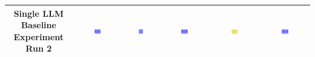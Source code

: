 \begin{table}[H]
\begin{tabular}{|c|c|c|c|c|c|}
    Single LLM Baseline Experiment Run 2 & \includegraphics[width=0.15\textwidth]{./run_2/png/gpt-4o_results/MicrofluidicChip.png} & \includegraphics[width=0.15\textwidth]{./run_2/png/claude-3-5-sonnet-20240620_results/MicrofluidicChip.png} & \includegraphics[width=0.15\textwidth]{./run_2/png/watsonx_meta-llama_llama-3-1-70b-instruct_results/MicrofluidicChip.png} & \includegraphics[width=0.15\textwidth]{./run_2/png/watsonx_meta-llama_llama-3-405b-instruct_results/MicrofluidicChip.png} & \includegraphics[width=0.15\textwidth]{./run_2/png/o1-preview_results/MicrofluidicChip.png} \\
    \hline

\end{tabular}
\end{table}
